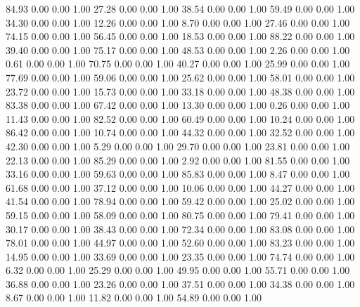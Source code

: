    84.93   0.00   0.00   1.00
   27.28   0.00   0.00   1.00
   38.54   0.00   0.00   1.00
   59.49   0.00   0.00   1.00
   34.30   0.00   0.00   1.00
   12.26   0.00   0.00   1.00
    8.70   0.00   0.00   1.00
   27.46   0.00   0.00   1.00
   74.15   0.00   0.00   1.00
   56.45   0.00   0.00   1.00
   18.53   0.00   0.00   1.00
   88.22   0.00   0.00   1.00
   39.40   0.00   0.00   1.00
   75.17   0.00   0.00   1.00
   48.53   0.00   0.00   1.00
    2.26   0.00   0.00   1.00
    0.61   0.00   0.00   1.00
   70.75   0.00   0.00   1.00
   40.27   0.00   0.00   1.00
   25.99   0.00   0.00   1.00
   77.69   0.00   0.00   1.00
   59.06   0.00   0.00   1.00
   25.62   0.00   0.00   1.00
   58.01   0.00   0.00   1.00
   23.72   0.00   0.00   1.00
   15.73   0.00   0.00   1.00
   33.18   0.00   0.00   1.00
   48.38   0.00   0.00   1.00
   83.38   0.00   0.00   1.00
   67.42   0.00   0.00   1.00
   13.30   0.00   0.00   1.00
    0.26   0.00   0.00   1.00
   11.43   0.00   0.00   1.00
   82.52   0.00   0.00   1.00
   60.49   0.00   0.00   1.00
   10.24   0.00   0.00   1.00
   86.42   0.00   0.00   1.00
   10.74   0.00   0.00   1.00
   44.32   0.00   0.00   1.00
   32.52   0.00   0.00   1.00
   42.30   0.00   0.00   1.00
    5.29   0.00   0.00   1.00
   29.70   0.00   0.00   1.00
   23.81   0.00   0.00   1.00
   22.13   0.00   0.00   1.00
   85.29   0.00   0.00   1.00
    2.92   0.00   0.00   1.00
   81.55   0.00   0.00   1.00
   33.16   0.00   0.00   1.00
   59.63   0.00   0.00   1.00
   85.83   0.00   0.00   1.00
    8.47   0.00   0.00   1.00
   61.68   0.00   0.00   1.00
   37.12   0.00   0.00   1.00
   10.06   0.00   0.00   1.00
   44.27   0.00   0.00   1.00
   41.54   0.00   0.00   1.00
   78.94   0.00   0.00   1.00
   59.42   0.00   0.00   1.00
   25.02   0.00   0.00   1.00
   59.15   0.00   0.00   1.00
   58.09   0.00   0.00   1.00
   80.75   0.00   0.00   1.00
   79.41   0.00   0.00   1.00
   30.17   0.00   0.00   1.00
   38.43   0.00   0.00   1.00
   72.34   0.00   0.00   1.00
   83.08   0.00   0.00   1.00
   78.01   0.00   0.00   1.00
   44.97   0.00   0.00   1.00
   52.60   0.00   0.00   1.00
   83.23   0.00   0.00   1.00
   14.95   0.00   0.00   1.00
   33.69   0.00   0.00   1.00
   23.35   0.00   0.00   1.00
   74.74   0.00   0.00   1.00
    6.32   0.00   0.00   1.00
   25.29   0.00   0.00   1.00
   49.95   0.00   0.00   1.00
   55.71   0.00   0.00   1.00
   36.88   0.00   0.00   1.00
   23.26   0.00   0.00   1.00
   37.51   0.00   0.00   1.00
   34.38   0.00   0.00   1.00
    8.67   0.00   0.00   1.00
   11.82   0.00   0.00   1.00
   54.89   0.00   0.00   1.00
